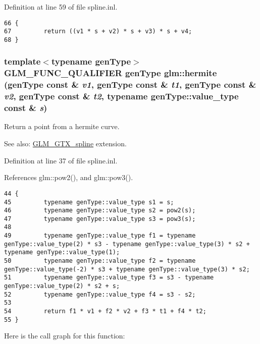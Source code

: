 Definition at line 59 of file spline.inl.

\begin{Code}\begin{verbatim}66 {
67         return ((v1 * s + v2) * s + v3) * s + v4;
68 }
\end{verbatim}
\end{Code}


\hypertarget{group__gtx__spline_ge95792c83c014a3c61b35312fb02679f}{
\subsubsection[hermite]{\setlength{\rightskip}{0pt plus 5cm}template$<$typename genType$>$ GLM\_\-FUNC\_\-QUALIFIER genType glm::hermite (genType const \& {\em v1}, \/  genType const \& {\em t1}, \/  genType const \& {\em v2}, \/  genType const \& {\em t2}, \/  typename genType::value\_\-type const \& {\em s})}}
\label{group__gtx__spline_ge95792c83c014a3c61b35312fb02679f}


Return a point from a hermite curve. \begin{Desc}
\item[See also:]\hyperlink{group__gtx__spline}{GLM\_\-GTX\_\-spline} extension. \end{Desc}


Definition at line 37 of file spline.inl.

References glm::pow2(), and glm::pow3().

\begin{Code}\begin{verbatim}44 {
45         typename genType::value_type s1 = s;
46         typename genType::value_type s2 = pow2(s);
47         typename genType::value_type s3 = pow3(s);
48 
49         typename genType::value_type f1 = typename genType::value_type(2) * s3 - typename genType::value_type(3) * s2 + typename genType::value_type(1);
50         typename genType::value_type f2 = typename genType::value_type(-2) * s3 + typename genType::value_type(3) * s2;
51         typename genType::value_type f3 = s3 - typename genType::value_type(2) * s2 + s;
52         typename genType::value_type f4 = s3 - s2;
53 
54         return f1 * v1 + f2 * v2 + f3 * t1 + f4 * t2;
55 }
\end{verbatim}
\end{Code}




Here is the call graph for this function: